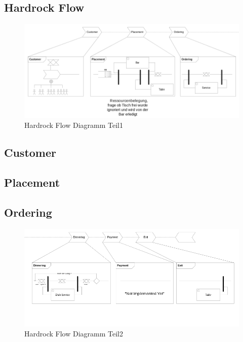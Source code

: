 \documentclass[ngerman,a4paper,12pt]{scrreprt}
\begin{document}
\begin{landscape}
	\section{Hardrock Flow}
		\begin{figure}[H]
			\centering
				\includegraphics[width=1.4\textwidth]{img/flowDiagramm1-v1.png}
				\caption[Hardrock Flow Diagramm Teil1]{Hardrock Flow Diagramm Teil1}
				\label{flowDiagramm1}
		\end{figure}
		
		\subsection{Customer}
		
		\subsection{Placement}
		
		\subsection{Ordering}
		
		
		\begin{figure}[H]
				\includegraphics[width=1.4\textwidth]{img/flowDiagramm2-v1.png}
				\caption[Hardrock Flow Diagramm Teil2]{Hardrock Flow Diagramm Teil2}
				\label{flowDiagramm2}
		\end{figure}
		

\end{landscape}
\end{document}
